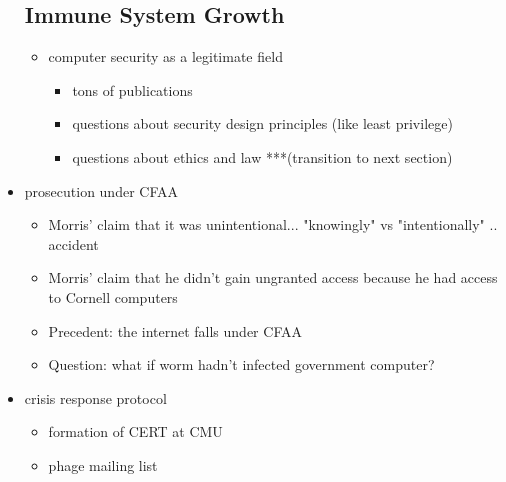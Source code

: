 \begin{itemize}
\subsection*{Immune System Growth}
	\begin{itemize}
	\item computer security as a legitimate field
        	\begin{itemize}
        	\item tons of publications
            \item questions about security design principles (like least privilege)
            \item questions about ethics and law ***(transition to next section)
        	\end{itemize}
		\end{itemize}
	\item prosecution under CFAA
    	\begin{itemize}
    	\item Morris' claim that it was unintentional... "knowingly" vs "intentionally"	.. accident
    	\item Morris' claim that he didn't gain ungranted access because he had access to Cornell computers
    	\item Precedent: the internet falls under CFAA
        \item Question: what if worm hadn't infected government computer?
    	\end{itemize}
    \item crisis response protocol
    	\begin{itemize}
    	\item formation of CERT at CMU
    	\item phage mailing list
    	\end{itemize}
    \end{itemize}